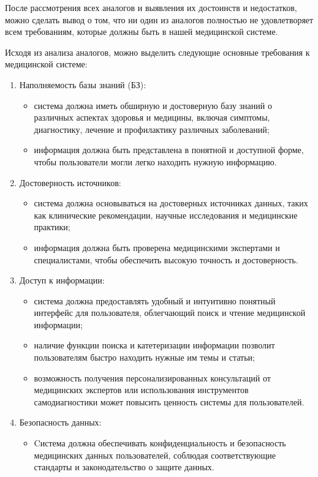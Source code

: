 После рассмотрения всех аналогов и выявления их достоинств и недостатков, можно сделать вывод о том, что ни один из аналогов полностью не удовлетворяет всем требованиям, которые должны быть в нашей медицинской системе.

 Исходя из анализа аналогов, можно выделить следующие основные требования к медицинской системе:

\begin{enumerate}[label=\arabic*)]
     \item Наполняемость базы знаний (БЗ):
        \begin{itemize}
            \item система должна иметь обширную и достоверную базу знаний о различных аспектах здоровья и медицины, включая симптомы, диагностику, лечение и профилактику различных заболеваний;
            \item информация должна быть представлена в понятной и доступной форме, чтобы пользователи могли легко находить нужную информацию.
        \end{itemize}
    \item Достоверность источников:
        \begin{itemize}
            \item система должна основываться на достоверных источниках данных, таких как клинические рекомендации, научные исследования и медицинские практики;
            \item информация должна быть проверена медицинскими экспертами и специалистами, чтобы обеспечить высокую точность и достоверность.
        \end{itemize}
    \item Доступ к информации:
        \begin{itemize}
            \item система должна предоставлять удобный и интуитивно понятный интерфейс для пользователя, облегчающий поиск и чтение медицинской информации;
            \item наличие функции поиска и катетеризации информации позволит пользователям быстро находить нужные им темы и статьи;
            \item возможность получения персонализированных консультаций от медицинских экспертов или использования инструментов самодиагностики может повысить ценность системы для пользователей.
        \end{itemize}
    \item Безопасность данных:
        \begin{itemize}
            \item Cистема должна обеспечивать конфиденциальность и безопасность медицинских данных пользователей, соблюдая соответствующие стандарты и законодательство о защите данных.
        \end{itemize}
 \end{enumerate}
 
